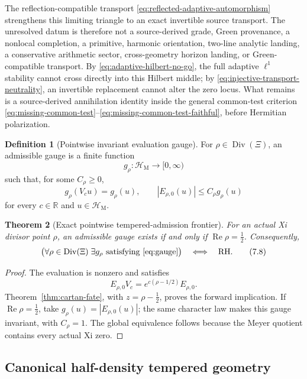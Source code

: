 \documentclass[11pt]{article}
\newtheorem{theorem}{Theorem}[section]
\theoremstyle{definition}
\newtheorem{definition}[theorem]{Definition}
\theoremstyle{remark}
\newcommand{\R}{\mathbb R}
\newcommand{\cH}{\mathcal H}
\newcommand{\Rea}{\operatorname{Re}}
\newcommand{\Div}{\operatorname{Div}}
\begin{document}
The reflection-compatible transport
\eqref{eq:reflected-adaptive-automorphism} strengthens this limiting triangle
to an exact invertible source transport.  The unresolved datum is therefore
not a source-derived grade, Green provenance, a nonlocal completion, a
primitive, harmonic orientation, two-line analytic landing, a conservative
arithmetic sector, cross-geometry horizon landing, or Green-compatible
transport.  By \eqref{eq:adaptive-hilbert-no-go}, the full adaptive
\(\ell^1\) stability cannot cross directly into this Hilbert middle; by
\eqref{eq:injective-transport-neutrality}, an invertible replacement cannot
alter the zero locus.  What remains is a source-derived annihilation identity
inside the general common-test criterion
\eqref{eq:missing-common-test}--\eqref{eq:missing-common-test-faithful},
before Hermitian polarization.

\begin{definition}[Pointwise invariant evaluation gauge]
\label{def:gauge}
For \(\rho\in\Div(\Xi)\), an admissible gauge is a finite function
\[
                         g_\rho:\cH_{\mathrm M}\longrightarrow[0,\infty)
\]
such that, for some \(C_\rho\ge0\),
\[
 g_\rho(V_cu)=g_\rho(u),\qquad
 |E_{\rho,0}(u)|\le C_\rho g_\rho(u)
\tag{7.7}\label{eq:gauge}
\]
for every \(c\in\R\) and \(u\in\cH_{\mathrm M}\).
\end{definition}

\begin{theorem}[Exact pointwise tempered-admission frontier]
\label{cor:rh}
For an actual Xi divisor point \(\rho\), an admissible gauge exists if
and only if \(\Rea\rho=\tfrac12\).  Consequently,
\[
 \bigl(\forall\rho\in\Div(\Xi)\;\exists g_\rho
       \text{ satisfying \eqref{eq:gauge}}\bigr)
 \quad\Longleftrightarrow\quad \mathrm{RH}.
\tag{7.8}\label{eq:gauge-rh}
\]
\end{theorem}

\begin{proof}
The evaluation is nonzero and satisfies
\[
              E_{\rho,0}V_c
              =e^{c(\rho-1/2)}E_{\rho,0}.
\]
Theorem~\ref{thm:cartan-fate}, with \(z=\rho-\tfrac12\), proves the forward
implication.  If \(\Rea\rho=\tfrac12\), take
\(g_\rho(u)=|E_{\rho,0}(u)|\); the same character law makes this gauge
invariant, with \(C_\rho=1\).  The global equivalence follows because the
Meyer quotient contains every actual Xi zero.
\end{proof}

\subsection{Canonical half-density tempered geometry}
\end{document}
